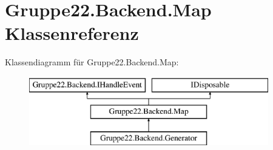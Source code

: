 \hypertarget{class_gruppe22_1_1_backend_1_1_map}{\section{Gruppe22.\-Backend.\-Map Klassenreferenz}
\label{class_gruppe22_1_1_backend_1_1_map}
}
Klassendiagramm für Gruppe22.\-Backend.\-Map\-:\begin{figure}[H]
\begin{center}
\leavevmode
\includegraphics[height=3.000000cm]{class_gruppe22_1_1_backend_1_1_map}
\end{center}
\end{figure}
